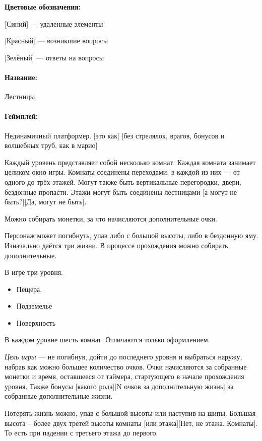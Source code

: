\documentclass[12pt,a4paper]{article}
\begin{document}
\textbf{Цветовые обозначения:}

{\color{blue} [Синий]} --- удаленные элементы

{\color{red} [Красный]} --- возникшие вопросы

{\color{ForestGreen} [Зелёный]} --- ответы на вопросы

\newcommand{\ans}[1]{{\color{ForestGreen}#1}}

\paragraph{Название:} Лестницы.
\paragraph{Геймплей:} Нединамичный платформер. {\color{red} [это как]} \ans{[без стрелялок, врагов, бонусов и волшебных труб, как в марио]}

Каждый уровень представляет собой несколько комнат. Каждая комната занимает целиком окно игры. Комнаты соединены переходами, в каждой из них --- от одного до трёх этажей. Могут также быть вертикальные перегородки, двери, бездонные пропасти. Этажи могут быть соединены лестницами {\color{red} [а могут не быть?]}\ans{[Да, могут не быть]}. 

Можно собирать монетки, за что начисляются дополнительные очки. 

Персонаж может погибнуть, упав либо с большой высоты, либо в бездонную яму. Изначально даётся три жизни. В процессе прохождения можно собирать дополнительные.

В игре три уровня.
\begin{itemize}
\item Пещера,
\item Подземелье
\item Поверхность
\end{itemize}

В каждом уровне шесть комнат. Отличаются только оформлением. 

\textit{Цель игры} --- не погибнув, дойти до последнего уровня и выбраться наружу, набрав как можно большее количество очков. Очки начисляются за собранные монетки и время, оставшееся от таймера, стартующего в начале прохождения уровня. Также бонусы {\color{red} [какого рода]}\ans{[N очков за дополнительную жизнь]} за собранные дополнительные жизни.

Потерять жизнь можно, упав с большой высоты или наступив на шипы. Большая высота -- более двух третей высоты комнаты {\color{red} [или этажа]}\ans{[Нет, не этажа. Комнаты]}. То есть при падении с третьего этажа до первого.
\end{document}
